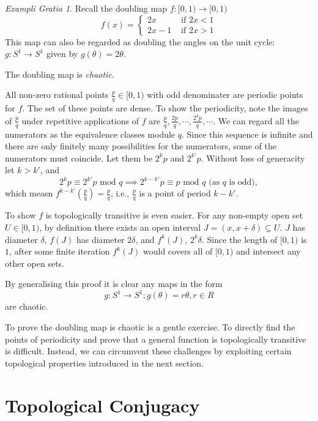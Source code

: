 \documentclass{report}
\theoremstyle{definition}
\theoremstyle{definition}
\theoremstyle{remark}
\newtheorem{example}[thm]{Exampli Gratia}
\renewcommand\mod{\text{ mod }}
\begin{document}
\begin{example}\label{ex_doubling_map}
	Recall the doubling map $f: [0,1) \rightarrow [0,1)$
	$$
	f(x) = 
		\begin{cases}
			2x &\text{ if } 2x < 1 \\
			2x -1 &\text{ if } 2x > 1
		\end{cases}
	$$
	This map can also be regarded as doubling the angles on the unit cycle: $g: S^1 \rightarrow S^1$ given by $ g(\theta) = 2 \theta$.
	
	The doubling map is \textit{chaotic}.

	All non-zero rational points $\frac{p}{q} \in [0,1)$ with odd denominater are periodic points for $f$. 
	The set of these points are dense.
	To show the periodicity, note the images of $\frac{p}{q}$ under repetitive applications of $f$ are $\frac{p}{q}, \frac{2p}{q}, \cdots, \frac{2^k p}{q}, \cdots$.
	We can regard all the numerators as the equivalence classes module $q$.
	Since this sequence is infinite and there are only finitely many possibilities for the numerators, some of the numerators must coincide. Let them be $2^k p$ and $2^{k'} p$. 
	Without loss of generacity let $k > k'$, and
	$$
	2^k p \equiv 2^{k'} p \mod q \implies 
	2^{k-k'} p \equiv p \mod q \text{ (as $q$ is odd)},
	$$
	which measn $f^{k-k'}(\frac{p}{q}) = \frac{p}{q}$, i.e., $\frac{p}{q}$ is a point of period $k - k'$.

	To show $f$ is topologically transitive is even easier. 
	For any non-empty open set $U \in [0,1)$, by definition there exists an open interval $J = (x, x+ \delta) \subseteq U$. 
	$J$ has diameter $\delta$, $f(J)$ has diameter $2 \delta$, and $f^k(J)$, $2^k \delta$. 
	Since the length of $[0,1)$ is $1$, after some finite iteration $f^k(J)$ would covers all of $[0,1)$ and intersect any other open sets.

	By generalising this proof it is clear any maps in the form 
	$$
	g: S^1 \rightarrow S^1; g(\theta) = r \theta, r \in R
	$$
	are chaotic.
\end{example}

To prove the doubling map is chaotic is a gentle exercise. 
To directly find the points of periodicity and prove that a general function is topologically transitive is difficult.
Instead, we can circumvent these challenges by exploiting certain topological properties introduced in the next section.

\section{Topological Conjugacy}
\end{document}
